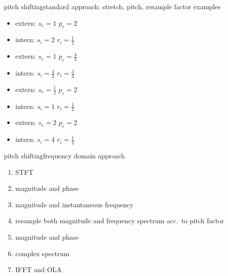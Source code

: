         \begin{frame}{pitch shifting}{standard approach: stretch, pitch, resample factor examples}

                \begin{itemize}
					\item	extern: $s_e=1$ $p_e=2$
					\pause
					\item[]	intern: $s_i=2$ $r_i=\frac{1}{2}$
					\pause
					\item	extern: $s_e=1$ $p_e=\frac{4}{3}$
					\pause
					\item[]	intern: $s_i=\frac{4}{3}$ $r_i=\frac{3}{4}$
					\pause
					\item	extern: $s_e=\frac{1}{2}$ $p_e=2$
					\pause
					\item[]	intern: $s_i=1$ $r_i=\frac{1}{2}$
					\pause
					\item	extern: $s_e=2$ $p_e=2$
					\pause
					\item[]	intern: $s_i=4$ $r_i=\frac{1}{2}$
				\end{itemize}
      \end{frame}
        \begin{frame}{pitch shifting}{frequency domain approach}
            \begin{enumerate}
                \item   STFT
                \item<2->   magnitude and phase
                \item<3->   magnitude and instantaneous frequency
                \item<4->   resample both magnitude and frequency spectrum acc.\ to pitch factor
                \item<5->   magnitude and phase
                \item<6->   complex spectrum
                \item<7->   IFFT and OLA
            \end{enumerate}
        \end{frame}
